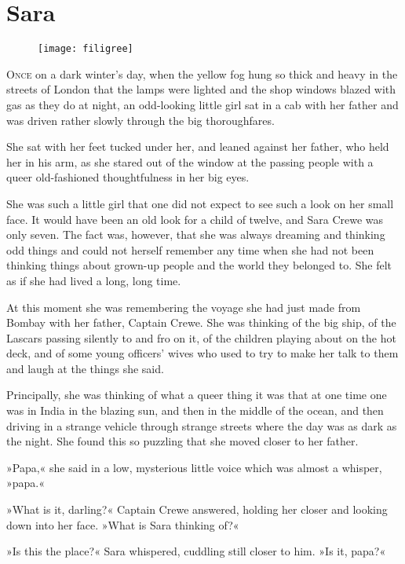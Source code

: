 \chapter{Sara}
\begin{figure}[t!]
\centering
\texttt{[image: filigree]}
\end{figure}
\lettrine[lines=5]{O}{nce} on a dark winter's day, when the yellow fog hung so thick and heavy in the streets of London that the lamps were lighted and the shop windows blazed with gas as they do at night, an odd-looking little girl sat in a cab with her father and was driven rather slowly through the big thoroughfares.

She sat with her feet tucked under her, and leaned against her father, who held her in his arm, as she stared out of the window at the passing people with a queer old-fashioned thoughtfulness in her big eyes.

She was such a little girl that one did not expect to see such a look on her small face. It would have been an old look for a child of twelve, and Sara Crewe was only seven. The fact was, however, that she was always dreaming and thinking odd things and could not herself remember any time when she had not been thinking things about grown-up people and the world they belonged to. She felt as if she had lived a long, long time.

At this moment she was remembering the voyage she had just made from Bombay with her father, Captain Crewe. She was thinking of the big ship, of the Lascars passing silently to and fro on it, of the children playing about on the hot deck, and of some young officers' wives who used to try to make her talk to them and laugh at the things she said.

Principally, she was thinking of what a queer thing it was that at one time one was in India in the blazing sun, and then in the middle of the ocean, and then driving in a strange vehicle through strange streets where the day was as dark as the night. She found this so puzzling that she moved closer to her father.

»Papa,« she said in a low, mysterious little voice which was almost a whisper, »papa.«

»What is it, darling?« Captain Crewe answered, holding her closer and looking down into her face. »What is Sara thinking of?«

»Is this the place?« Sara whispered, cuddling still closer to him. »Is it, papa?«

